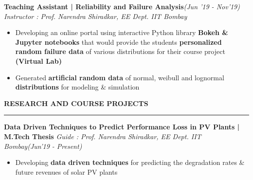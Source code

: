 \documentclass[10 pt]{article}%
\begin{document}
{{{\flushleft \bf {\large{Teaching Assistant | Reliability and Failure Analysis}}}\hfill {{{\em{(Jun '19 - Nov'19)}}}}
\vspace{-0.8em}
{\flushleft \em{Instructor : Prof. Narendra Shiradkar, EE Dept. IIT Bombay}}
\vspace{-5pt}
\begin{itemize}[leftmargin=*]
	\setlength\itemsep{1pt}
	\setlength\parskip{1pt}
		\item Developing an online portal using interactive Python library \textbf{Bokeh \& Jupyter notebooks} that would provide the students \textbf{personalized random failure data} of various distributions for their course project \textbf{(Virtual Lab)}
\item Generated \textbf{artificial random data} of normal, weibull and lognormal \textbf{distributions} for modeling \& simulation
\end{itemize}
\begin{flushleft}\bf{\large{RESEARCH AND COURSE PROJECTS}}\end{flushleft}
\vspace{-1.5mm}
\hrule
{\flushleft \textbf {\large{Data Driven Techniques to Predict Performance Loss in PV Plants | M.Tech Thesis}}%
\vspace{-0.8em}
{\flushleft \em{Guide :  Prof. Narendra Shiradkar, EE Dept. IIT Bombay}\hfill{\textit{(Jun'19 - Present)}}}
\vspace{-5pt}
\begin{itemize}[leftmargin=*]
	\setlength\itemsep{1pt}
	\setlength\parskip{1pt}
		\item Developing \textbf{data driven techniques} for predicting the degradation rates \& future revenues of solar PV plants

\end{itemize}}}}
\end{document}
